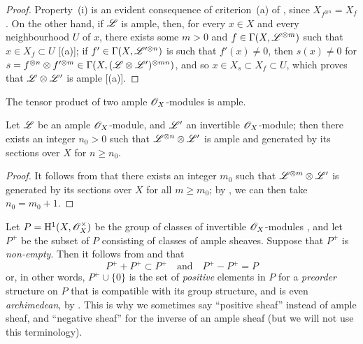 \begin{proof}
  Property~(i) is an evident consequence of criterion~(a) of , since $X_{f^{\otimes n}}=X_f$.
  On the other hand, if $\mathscr{L}$ is ample, then, for every $x\in X$ and every neighbourhood $U$ of $x$, there exists some $m>0$ and $f\in\Gamma(X,\mathscr{L}^{\otimes m})$ such that $x\in X_f\subset U$ [(a)];
  if $f'\in\Gamma(X,\mathscr{L}'^{\otimes n})$ is such that $f'(x)\neq0$, then $s(x)\neq0$ for $s=f^{\otimes n}\otimes f'^{\otimes m}\in\Gamma(X,(\mathscr{L}\otimes\mathscr{L}')^{\otimes mn})$, and so $x\in X_s\subset X_f\subset U$, which proves that $\mathscr{L}\otimes\mathscr{L}'$ is ample [(a)].
\end{proof}

\begin{corollary}[4.5.7]
\label{II.4.5.7}
The tensor product of two ample $\mathscr{O}_X$-modules is ample.
\end{corollary}

\begin{corollary}[4.5.8]
\label{II.4.5.8}
Let $\mathscr{L}$ be an ample $\mathscr{O}_X$-module, and $\mathscr{L}'$ an invertible $\mathscr{O}_X$-module;
then there exists an integer $n_0>0$ such that $\mathscr{L}^{\otimes n}\otimes\mathscr{L}'$ is ample and generated by its sections over $X$ for $n\geq n_0$.
\end{corollary}

\begin{proof}
It follows from  that there exists an integer $m_0$ such that $\mathscr{L}^{\otimes m}\otimes\mathscr{L}'$ is generated by its sections over $X$ for all $m\geq m_0$;
by , we can then take $n_0=m_0+1$.
\end{proof}

\begin{remark}[4.5.9]
\label{II.4.5.9}
Let $P=\mathrm{H}^1(X,\mathscr{O}_X^\times)$ be the group of classes of invertible $\mathscr{O}_X$-modules , and let $P^+$ be the subset of $P$ consisting of classes of ample sheaves.
Suppose that $P^+$ is \emph{non-empty}.
Then it follows from  and  that
\[
  P^+ + P^+ \subset P^+
  \quad\text{and}\quad
  P^+ - P^+ = P
\]
or, in other words, $P^+\cup\{0\}$ is the set of \emph{positive} elements in $P$ for a \emph{preorder} structure on $P$ that is compatible with its group structure, and is even \emph{archimedean}, by .
This is why we sometimes say ``positive sheaf'' instead of ample sheaf, and ``negative sheaf'' for the inverse of an ample sheaf (but we will not use this terminology).
\end{remark}

